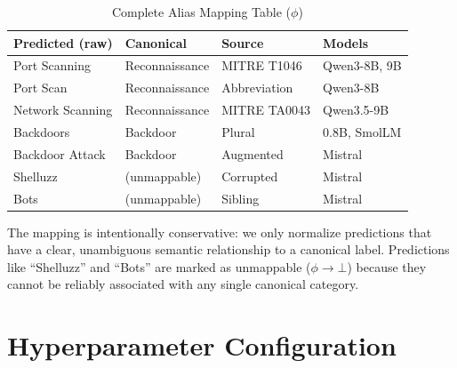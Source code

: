\documentclass[journal]{IEEEtran}
\begin{document}
\begin{table}[!ht]
\centering
\caption{Complete Alias Mapping Table ($\phi$)}
\label{tab:aliasmap}
\begin{tabular}{llll}
\toprule
\textbf{Predicted (raw)} & \textbf{Canonical} & \textbf{Source} & \textbf{Models} \\
\midrule
Port Scanning & Reconnaissance & MITRE T1046 & Qwen3-8B, 9B \\
Port Scan & Reconnaissance & Abbreviation & Qwen3-8B \\
Network Scanning & Reconnaissance & MITRE TA0043 & Qwen3.5-9B \\
Backdoors & Backdoor & Plural & 0.8B, SmolLM \\
Backdoor Attack & Backdoor & Augmented & Mistral \\
Shelluzz & (unmappable) & Corrupted & Mistral \\
Bots & (unmappable) & Sibling & Mistral \\
\bottomrule
\end{tabular}
\end{table}

The mapping is intentionally conservative: we only normalize predictions that have a clear, unambiguous semantic relationship to a canonical label. Predictions like ``Shelluzz'' and ``Bots'' are marked as unmappable ($\phi \to \bot$) because they cannot be reliably associated with any single canonical category.

\section{Hyperparameter Configuration}
\label{app:hyperparams}
\end{document}
